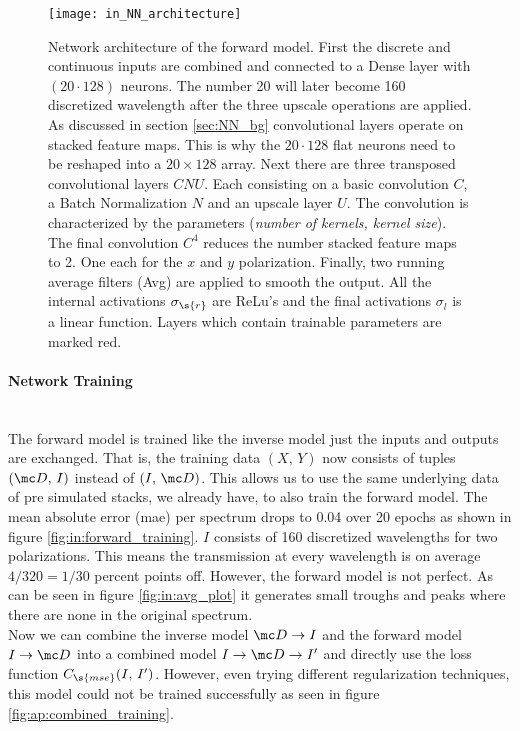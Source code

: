 \begin{figure}[H]
    \centering
    \texttt{[image: in\_NN\_architecture]}
    \caption{Network architecture of the forward model. First the discrete and continuous inputs are combined and connected to a Dense layer with 
    $(20 \cdot 128)$
    neurons. The number 20 will later become 160 discretized wavelength after the three upscale operations are applied. As discussed in section \ref{sec:NN_bg} convolutional layers operate on stacked feature maps. This is why the $20 \cdot 128$ flat neurons need to be reshaped into a $20 \times 128$ array. Next there are three transposed convolutional layers $CNU$. Each consisting on a basic convolution $C$, a Batch Normalization $N$ and an upscale layer $U$. The convolution is characterized by the parameters (\textit{number of kernels, kernel size}). The final convolution $C^4$ reduces the number stacked feature maps to 2. One each for the $x$ and $y$ polarization. Finally, two running average filters (Avg) are applied to smooth the output. All the internal activations $\sigma_\s{r}$ are ReLu's and the final activations $\sigma_{l}$ is a linear function.
    Layers which contain trainable parameters are marked red.
    }
    \label{fig:in:NN}
\end{figure}



\newpage
\paragraph{Network Training}~\\
The forward model is trained like the inverse model just the inputs and outputs are exchanged. That is, the training data $(X,\, Y)$ now consists of tuples 
$(\mc D,\, I)$ instead of $(I,\, \mc D)$.
This allows us to use the same underlying data of pre simulated stacks, we already have, to also train the forward model. 
The mean absolute error (mae) per spectrum drops to 0.04 over 20 epochs as shown in figure \ref{fig:in:forward_training}. $I$ consists of 160 discretized wavelengths for two polarizations. This means the transmission at every wavelength is on average $4/320 = 1/30$ percent points off. However, the forward model is not perfect. As can be seen in figure \ref{fig:in:avg_plot} it generates small troughs and peaks where there are none in the original spectrum.
\\

\indent
Now we can combine the inverse model $\mc D \rightarrow I$ and the forward model $I \rightarrow \mc D$ into a combined model $I \rightarrow \mc D \rightarrow I'$ and directly use the loss function $C_\s{mse}(I,\, I')$.
However, even trying different regularization techniques, this model could not be trained successfully as seen in figure \ref{fig:ap:combined_training}.  


